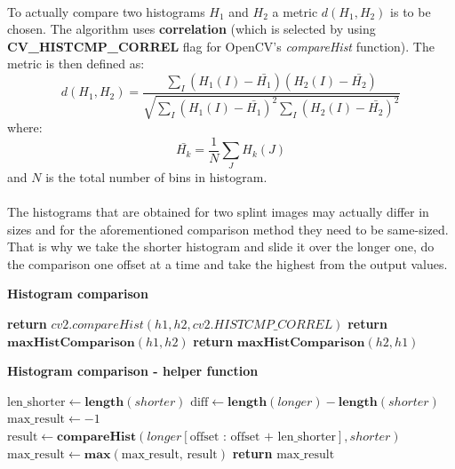 \paragraph{}
To actually compare two histograms $H_1$ and $H_2$ a metric $d(H_1, H_2)$ is to be chosen. The algorithm uses \textbf{correlation} (which is selected by using \textbf{CV\_HISTCMP\_CORREL} flag for OpenCV's \textit{compareHist} function). The metric is then defined as:
\begin{equation}
	d(H_1, H_2) = \frac{\sum_I(H_1(I) - \bar{H_1})(H_2(I) - \bar{H_2})}{\sqrt{\sum_I(H_1(I) - \bar{H_1})^2 \sum_I(H_2(I) - \bar{H_2})^2}}
\end{equation}
where:
\begin{equation}
	\bar{H_k} = \frac{1}{N} \sum_J H_k(J)
\end{equation}
and $N$ is the total number of bins in histogram.

\paragraph{}
The histograms that are obtained for two splint images may actually differ in sizes and for the aforementioned comparison method they need to be same-sized. That is why we take the shorter histogram and slide it over the longer one, do the comparison one offset at a time and take the highest from the output values.

\begin{algorithm}{\textbf{Histogram comparison}}
	\begin{spacing}{1.5}
	\begin{algorithmic}[1]
				\State \textbf{return} $cv2.compareHist(h1, h2, cv2.HISTCMP\_CORREL)$
				\State \textbf{return} $\textbf{maxHistComparison}(h1, h2)$
			\Else
				\State \textbf{return} $\textbf{maxHistComparison}(h2, h1)$
			\EndIf
		\EndFunction
	\end{algorithmic}
	\end{spacing}
\end{algorithm}

\begin{algorithm}{\textbf{Histogram comparison - helper function}}
	\begin{spacing}{1.5}
	\begin{algorithmic}[1]
			\State $\text{len\_shorter} \gets \textbf{length}(shorter)$
			\State $\text{diff} \gets \textbf{length}(longer) - \textbf{length}(shorter)$
			\State $\text{max\_result} \gets -1$
				\State $\text{result} \gets \textbf{compareHist}(longer[\text{offset : offset + len\_shorter}], shorter)$
				\State $\text{max\_result} \gets \textbf{max}(\text{max\_result, result})$
			\EndFor
			\State \textbf{return} $\text{max\_result}$
		\EndFunction
	\end{algorithmic}
	\end{spacing}
\end{algorithm}

